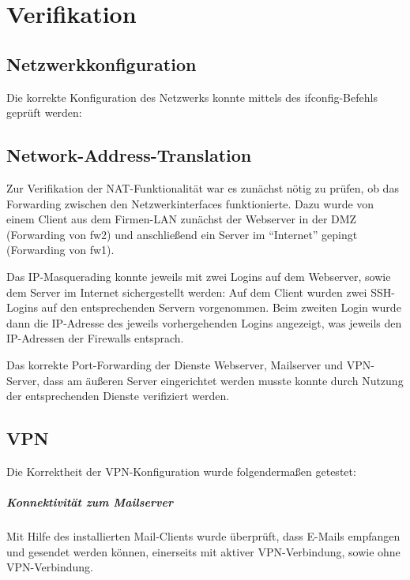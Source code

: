 \chapter{Verifikation}
\section{Netzwerkkonfiguration}
Die korrekte Konfiguration des Netzwerks konnte mittels des ifconfig-Befehls geprüft werden: %


\section{Network-Address-Translation}
Zur Verifikation der NAT-Funktionalität war es zunächst nötig zu prüfen, ob das Forwarding zwischen den Netzwerkinterfaces funktionierte. Dazu wurde von einem Client aus dem Firmen-LAN zunächst der Webserver in der DMZ (Forwarding von fw2) und anschließend ein Server im "`Internet"' gepingt (Forwarding von fw1). %


Das IP-Masquerading konnte jeweils mit zwei Logins auf dem Webserver, sowie dem Server im Internet sichergestellt werden: Auf dem Client wurden zwei SSH-Logins auf den entsprechenden Servern vorgenommen. Beim zweiten Login wurde dann die IP-Adresse des jeweils vorhergehenden Logins angezeigt, was jeweils den IP-Adressen der Firewalls entsprach.


Das korrekte Port-Forwarding der Dienste Webserver, Mailserver und VPN-Server, dass am äußeren Server eingerichtet werden musste konnte durch Nutzung der entsprechenden Dienste verifiziert werden.

\section{VPN}
Die Korrektheit der VPN-Konfiguration wurde folgendermaßen getestet:

\paragraph{Konnektivität zum Mailserver}
Mit Hilfe des installierten Mail-Clients wurde überprüft, dass E-Mails empfangen und gesendet werden können, einerseits mit aktiver VPN-Verbindung, sowie ohne VPN-Verbindung.

